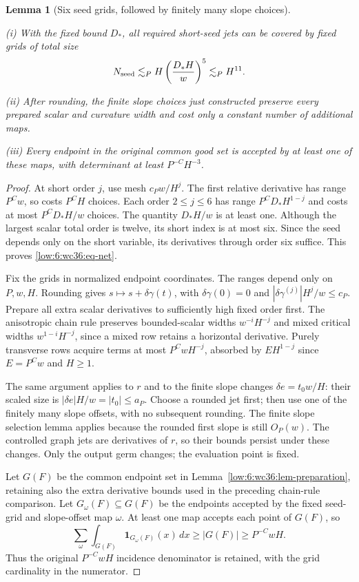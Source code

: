 \documentclass[11pt]{amsart}
\newtheorem{lemma}[theorem]{Lemma}
\theoremstyle{definition}
\theoremstyle{remark}
\numberwithin{equation}{section}
\begin{document}
\begin{lemma}[Six seed grids, followed by finitely many slope choices]\label{low:6:wc36:lem-nets}

\noindent\textup{(i)} With the fixed bound $D_*$, all required short-seed jets can be covered by fixed grids of total size
\begin{equation}\label{low:6:wc36:eq-net}
N_{\rm seed}\lesssim_P H\left(\frac{D_*H}{w}\right)^5\lesssim_P H^{11}.
\end{equation}

\noindent\textup{(ii)} After rounding, the finite slope choices just constructed preserve every prepared scalar and curvature width and cost only a constant number of additional maps.

\noindent\textup{(iii)} Every endpoint in the original common good set is accepted by at least one of these maps, with determinant at least $P^{-C}H^{-3}$.
\end{lemma}
\begin{proof}
At short order $j$, use mesh $c_Pw/H^j$. The first relative derivative has range $P^Cw$, so costs $P^CH$ choices. Each order $2\le j\le6$ has range $P^CD_*H^{1-j}$ and costs at most $P^CD_*H/w$ choices. The quantity $D_*H/w$ is at least one. Although the largest scalar total order is twelve, its short index is at most six. Since the seed depends only on the short variable, its derivatives through order six suffice. This proves \eqref{low:6:wc36:eq-net}.

Fix the grids in normalized endpoint coordinates. The ranges depend only on $P,w,H$. Rounding gives $s\mapsto s+\delta\gamma(t)$, with $\delta\gamma(0)=0$ and $|\delta\gamma^{(j)}|H^j/w\le c_P$. Prepare all extra scalar derivatives to sufficiently high fixed order first. The anisotropic chain rule preserves bounded-scalar widths $w^{-i}H^{-j}$ and mixed critical widths $w^{1-i}H^{-j}$, since a mixed row retains a horizontal derivative. Purely transverse rows acquire terms at most $P^CwH^{-j}$, absorbed by $EH^{1-j}$ since $E=P^Cw$ and $H\ge1$.

The same argument applies to $r$ and to the finite slope changes $\delta e=t_0w/H$: their scaled size is $|\delta e|H/w=|t_0|\le a_P$. Choose a rounded jet first; then use one of the finitely many slope offsets, with no subsequent rounding. The finite slope selection lemma applies because the rounded first slope is still $O_P(w)$. The controlled graph jets are derivatives of $r$, so their bounds persist under these changes. Only the output germ changes; the evaluation point is fixed.

Let $G(F)$ be the common endpoint set in Lemma~\ref{low:6:wc36:lem-preparation}, retaining also the extra derivative bounds used in the preceding chain-rule comparison. Let $G_\omega(F)\subseteq G(F)$ be the endpoints accepted by the fixed seed-grid and slope-offset map $\omega$. At least one map accepts each point of $G(F)$, so
\[
\sum_\omega\int_{G(F)}\mathbf1_{G_\omega(F)}(x)\,dx\ge|G(F)|\ge P^{-C}wH.
\]
Thus the original $P^{-C}wH$ incidence denominator is retained, with the grid cardinality in the numerator.
\end{proof}
\end{document}
